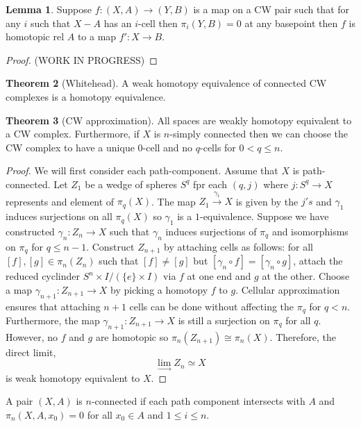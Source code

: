 \documentclass[12pt]{extarticle}
\theoremstyle{definition}
\newtheorem{theorem}{Theorem}[section]
\newtheorem{lemma}[theorem]{Lemma}
\newenvironment{definition}[1][Definition:]{\begin{trivlist}
\item[\hskip \labelsep {\bfseries #1}]}{\end{trivlist}}
\begin{document}
\begin{lemma}
Suppose $f : (X, A) \to (Y, B)$ is a map on a CW pair such that for any $i$ such that $X-A$ has an $i$-cell then $\pi_i(Y, B) = 0$ at any basepoint then $f$ is homotopic rel $A$ to a map $f' : X \to B$. 
\end{lemma}

\begin{proof}
(WORK IN PROGRESS)
\end{proof}

\begin{theorem}[Whitehead]
A weak homotopy equivalence of connected CW complexes is a homotopy equivalence. 
\end{theorem}

\begin{theorem}[CW approximation]
All spaces are weakly homotopy equivalent to a CW complex. Furthermore, if $X$ is $n$-simply connected then we can choose the CW complex to have a unique $0$-cell and no $q$-cells for $0 < q \le n$. 
\end{theorem}

\begin{proof}
We will first consider each path-component. Assume that $X$ is path-connected. Let $Z_1$ be a wedge of spheres $S^q$ fpr each $(q,j)$ where $j : S^q \to X$ represents and element of $\pi_q(X)$. The map $Z_1 \xrightarrow{\gamma_1} X$ is given by the $j's$ and $\gamma_1$ induces surjections on all $\pi_q(X)$ so $\gamma_1$ is a $1$-equivalence. Suppose we have constructed $\gamma_n : Z_n \to X$ such that $\gamma_n$ induces surjections of $\pi_q$ and isomorphisms on $\pi_q$ for $q \le n - 1$. Construct $Z_{n+1}$ by attaching cells as follows: for all $[f], [g] \in \pi_n(Z_n)$ such that $[f] \neq [g]$ but $[\gamma_n \circ f] = [\gamma_n \circ g]$, attach the reduced cyclinder $S^n \times I /(\{e\} \times I)$ via $f$ at one end and $g$ at the other. Choose a map $\gamma_{n + 1} : Z_{n+1} \to X$ by picking a homotopy $f$ to $g$. Cellular approximation ensures that attaching $n+1$ cells can be done without affecting the $\pi_q$ for $q < n$. Furthermore, the map $\gamma_{n+1} : Z_{n+1} \to X$ is still a surjection on $\pi_q$ for all $q$. However, no $f$ and $g$ are homotopic so $\pi_n(Z_{n+1}) \cong \pi_n(X)$. Therefore, the direct limit,
\[ \lim\limits_{\to} Z_n \simeq X\]
is weak homotopy equivalent to $X$.  
\end{proof}

\begin{definition}
A pair $(X, A)$ is $n$-connected if each path component intersects with $A$ and $\pi_n(X, A, x_0) = 0$ for all $x_0 \in A$ and $1 \le i \le n$. 
\end{definition}
\end{document}
